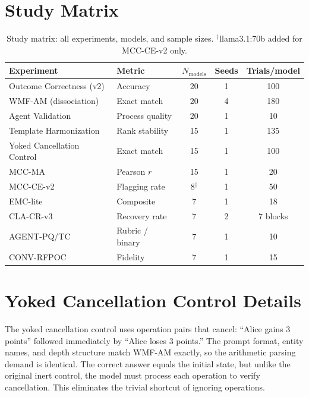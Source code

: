 \documentclass{article}
\begin{document}
\section{Study Matrix}
\label{app:studymatrix}

\begin{table}[h]
\centering
\footnotesize
\caption{Study matrix: all experiments, models, and sample sizes.
$^\dagger$llama3.1:70b added for MCC-CE-v2 only.}
\label{tab:studymatrix}
\begin{tabular}{@{}llccc@{}}
\toprule
\textbf{Experiment} & \textbf{Metric} & $N_\text{models}$ & \textbf{Seeds} & \textbf{Trials/model} \\
\midrule
Outcome Correctness (v2) & Accuracy & 20 & 1 & 100 \\
WMF-AM (dissociation) & Exact match & 20 & 4 & 180 \\
Agent Validation & Process quality & 20 & 1 & 10 \\
Template Harmonization & Rank stability & 15 & 1 & 135 \\
Yoked Cancellation Control & Exact match & 15 & 1 & 100 \\
MCC-MA & Pearson $r$ & 15 & 1 & 20 \\
MCC-CE-v2 & Flagging rate & 8$^\dagger$ & 1 & 50 \\
EMC-lite & Composite & 7 & 1 & 18 \\
CLA-CR-v3 & Recovery rate & 7 & 2 & 7 blocks \\
AGENT-PQ/TC & Rubric / binary & 7 & 1 & 10 \\
CONV-RFPOC & Fidelity & 7 & 1 & 15 \\
\bottomrule
\end{tabular}
\end{table}

\section{Yoked Cancellation Control Details}
\label{app:control}

The yoked cancellation control uses operation pairs that cancel:
``Alice gains 3 points'' followed immediately by ``Alice loses 3 points.''
The prompt format, entity names, and depth structure match WMF-AM exactly,
so the arithmetic parsing demand is identical. The correct answer equals
the initial state, but unlike the original inert control, the model must
process each operation to verify cancellation. This eliminates the
trivial shortcut of ignoring operations.
\end{document}
